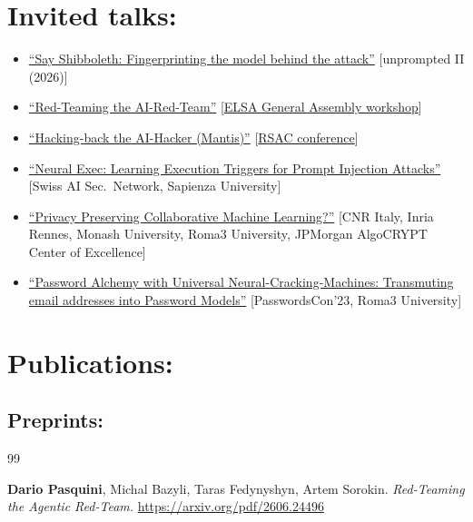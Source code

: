 \documentclass[10pt]{article} %
\begin{document}
\noindent\makebox[\linewidth]{\rule{.2\paperwidth}{0.3pt}}
\section*{Invited talks:}
\begin{itemize}
\itemsep0em
	\item \href{https://pasquini-dario.github.io/shibboleths.pdf}{``Say Shibboleth: Fingerprinting the model behind the attack''} [unprompted II (2026)]
	\item \href{https://pasquini-dario.github.io/red_teaming_the_ai_red_team.pdf}{``Red-Teaming the AI-Red-Team''} [\href{https://www.youtube.com/watch?v=1zjRRML9AdE}{ELSA General Assembly workshop}]
	\item \href{https://drive.google.com/file/d/1xv9YyYow7fGGV0_g8KZnglfCDIAomPqe/view?usp=sharing}{``Hacking-back the AI-Hacker (Mantis)''} [\href{https://www.youtube.com/watch?v=9aXgfQmIGoQ}{RSAC conference}]
	\item \href{https://pasquini-dario.github.io/nn.pdf}{``Neural Exec: Learning Execution Triggers for Prompt Injection Attacks''} [Swiss AI Sec.\ Network, Sapienza University]
	\item \href{https://pasquini-dario.github.io/PPCML.pdf}{``Privacy Preserving Collaborative Machine Learning?''} [CNR Italy, Inria Rennes, Monash University, Roma3 University, JPMorgan AlgoCRYPT Center of Excellence]
	\item \href{https://drive.google.com/file/d/1MWtoJpqIsVgEhI15jQjWzuEX5YqJT4P4/view}{``Password Alchemy with Universal Neural-Cracking-Machines: Transmuting email addresses into Password Models''} [PasswordsCon'23, Roma3 University]
\end{itemize}

\noindent\makebox[\linewidth]{\rule{.2\paperwidth}{0.3pt}}

\noindent\section*{Publications:}

\subsection*{Preprints:}
\vspace{.5cm}
\let\oldsection\section
\renewcommand{\section}[2]{}
\begin{thebibliography}{99}
\setcounter{enumiv}{7} 
	

	\textbf{Dario Pasquini},  Michal Bazyli, Taras Fedynyshyn, Artem Sorokin. \textit{Red-Teaming the Agentic Red-Team.} \url{https://arxiv.org/pdf/2606.24496}

	

 \end{thebibliography}
\end{document}
